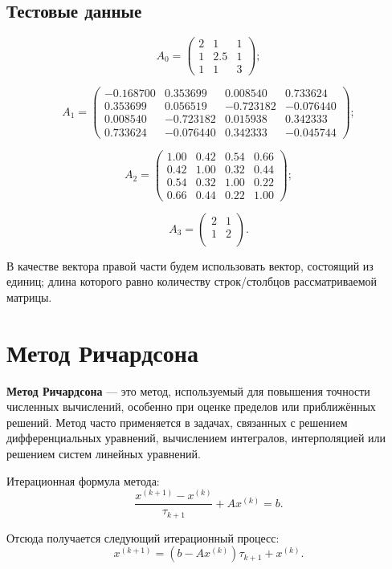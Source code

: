 \documentclass[a4paper,12pt]{article}
\begin{document}
	\subsection{Тестовые данные}
	\[
	A_0 =
	\begin{pmatrix}
		2 & 1 & 1 \\
		1 & 2.5 & 1 \\
		1 & 1 & 3
	\end{pmatrix};
	\]
	
	\[
	A_1 =
	\begin{pmatrix}
		-0.168700 & 0.353699 & 0.008540 & 0.733624 \\
		0.353699 & 0.056519 & -0.723182 & -0.076440 \\
		0.008540 & -0.723182 & 0.015938 & 0.342333 \\
		0.733624 & -0.076440 & 0.342333 & -0.045744
	\end{pmatrix};
	\]
	
	\[
	A_2 =
	\begin{pmatrix}
		1.00 & 0.42 & 0.54 & 0.66 \\
		0.42 & 1.00 & 0.32 & 0.44 \\
		0.54 & 0.32 & 1.00 & 0.22 \\
		0.66 & 0.44 & 0.22 & 1.00
	\end{pmatrix};
	\]
	
	\[A_3 = 
	\begin{pmatrix}
		2 & 1\\
		1 & 2\\
	\end{pmatrix}.
	\]
	
	В качестве вектора правой части будем использовать вектор, состоящий из единиц; длина которого равно количеству строк/столбцов рассматриваемой матрицы.
	
	\newpage
	
	\section{Метод Ричардсона}
	\textbf{Метод Ричардсона\cite{cm}} — это метод, используемый для повышения точности численных вычислений, особенно при оценке пределов или приближённых решений. Метод часто применяется в задачах, связанных с решением дифференциальных уравнений, вычислением интегралов, интерполяцией или решением систем линейных уравнений.
	
	Итерационная формула метода:
	\[
		\frac{x^{(k+1)} - x ^{(k)}}{\tau_{k+1}}  + A x^{(k)}= b. 
	\]
	
	Отсюда получается следующий итерационный процесс:
	\[
		x^{(k+1)} = \left(b - A x^{(k)}\right) \tau_{k+1} + x^{(k)}.
	\]
	
\end{document}
